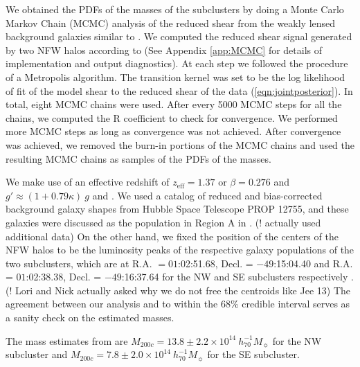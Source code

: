
We obtained the PDFs of the masses of the subclusters by doing a Monte
Carlo Markov Chain (MCMC) analysis of the reduced shear from the
weakly lensed background galaxies similar to \citet{Dawson12}. We computed the reduced shear signal
generated by two NFW halos according to \citet{Umetsu10} (See Appendix
\ref{app:MCMC} for
details of implementation and output diagnostics).
At each step we followed the procedure of a
Metropolis algorithm.  The transition kernel was set to
be the log likelihood of fit of the model shear to the reduced shear of the
data (\ref{eqn:jointposterior}).
In total, eight MCMC chains were used. After every 5000 MCMC steps for all
the chains, we computed the R coefficient \citep{Gelman92}  to
check for convergence. We performed more MCMC steps as long as convergence
was not achieved. After convergence was achieved, we removed the
burn-in portions of the MCMC chains and used the resulting MCMC chains as
samples of the PDFs of the masses. \par 
We make use of an effective redshift of $z_{\text{eff}} = 1.37$ or $\beta
= 0.276$  and $g' \approx (1 + 0.79 \kappa)~g$ 
and \citep{Seitz97}.    
We used a catalog of reduced and bias-corrected background 
galaxy shapes from Hubble Space Telescope PROP 12755, and these galaxies
were discussed as the population in Region A in
. (! \citealt{Jee13} actually used
additional data) On the other hand, we fixed the
position of the centers of the NFW halos to be  the luminosity peaks of the
respective galaxy populations of  the two subclusters, which are at R.A. $=
01$:02:51.68, Decl. = $-49$:15:04.40 and R.A. = $01$:02:38.38, Decl. =
$-49$:16:37.64 for the NW and SE subclusters
respectively . (! Lori and Nick actually asked why we do not free
the centroids like Jee 13)  The agreement between our analysis and  to within
the 68\% credible interval serves as a sanity check on the estimated masses. 

The mass estimates from \citealt{Jee13} are $M_{200c} = 13.8 \pm
2.2 \times 10^{14}~h_{70}^{-1} M_{\sun}$ for the NW subcluster and $ M_{200c} = 7.8 \pm
2.0 \times 10^{14}~h_{70}^{-1} M_{\sun}$ for the SE subcluster. 
